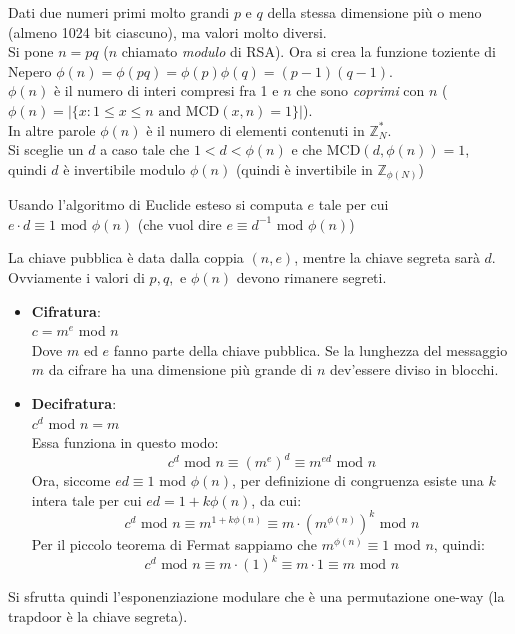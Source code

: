 Dati due numeri primi molto grandi $p$ e $q$ della stessa dimensione più o meno (almeno 1024 bit ciascuno), ma valori molto diversi.\\
Si pone $n=pq$ ($n$ chiamato \textit{modulo} di RSA).
Ora si crea la funzione toziente di Nepero $\phi(n) = \phi(pq) = \phi(p)\phi(q) = (p-1)(q-1)$.\\
$\phi(n)$ è il numero di interi compresi fra 1 e $n$ che sono \textit{coprimi} con $n$ ($\phi(n) = |\{x:1 \leq x \leq n \text{ and MCD}(x,n) = 1\}|$).\\
In altre parole $\phi(n)$ è il numero di elementi contenuti in $\mathbb{Z}_N^*$.\\


Si sceglie un $d$ a caso tale che $1 < d < \phi(n)$ e che MCD$(d, \phi(n)) = 1$, quindi $d$ è invertibile modulo $\phi(n)$ (quindi è invertibile in $\mathbb{Z}_{\phi(N)}$)

Usando l'algoritmo di Euclide esteso si computa $e$ tale per cui $e \cdot d \equiv 1 \text{ mod } \phi(n)$ (che vuol dire $e \equiv d^{-1} \text{ mod } \phi(n)$)

La chiave pubblica è data dalla coppia $(n, e)$, mentre la chiave segreta sarà $d$. Ovviamente i valori di $p, q, $ e $\phi(n)$ devono rimanere segreti.

\begin{itemize}
	\item \textbf{Cifratura}:\\
	$c=m^e$ mod $n$\\
	Dove $m$ ed $e$ fanno parte della chiave pubblica. Se la lunghezza del messaggio $m$ da cifrare ha una dimensione più grande di $n$ dev'essere diviso in blocchi.
	\item \textbf{Decifratura}:\\
	$c^d$ mod $n = m$\\
	Essa funziona in questo modo:
	\begin{equation*}
		c^d \text{ mod } n \equiv (m^e)^d \equiv m^{ed} \text { mod } n
	\end{equation*}
	Ora, siccome $ed\equiv 1$ mod $\phi(n)$, per definizione di congruenza esiste una $k$ intera tale per cui $ed = 1 + k\phi(n)$, da cui:
	\begin{equation*}
		c^d \text{ mod } n \equiv m^{1+k\phi(n)} \equiv m \cdot (m^{\phi(n)})^k \text { mod } n
	\end{equation*}
Per il piccolo teorema di Fermat sappiamo che $m^{\phi(n)} \equiv 1$ mod $n$, quindi:
\begin{equation*}
	c^d \text{ mod } n \equiv m \cdot (1)^k \equiv m \cdot 1 \equiv m \text{ mod } n
\end{equation*}
	
\end{itemize}
Si sfrutta quindi l'esponenziazione modulare che è una permutazione one-way (la trapdoor è la chiave segreta).

